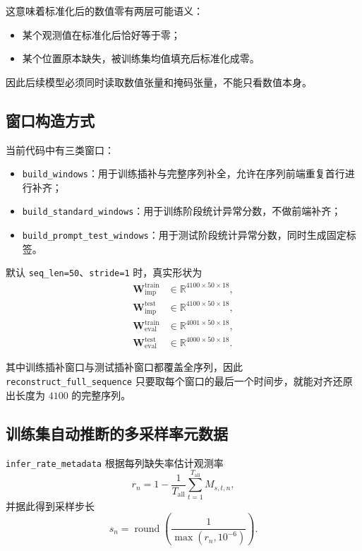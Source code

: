 \documentclass[UTF8]{ctexart}
\begin{document}
这意味着标准化后的数值零有两层可能语义：
\begin{itemize}
    \item 某个观测值在标准化后恰好等于零；
    \item 某个位置原本缺失，被训练集均值填充后标准化成零。
\end{itemize}

因此后续模型必须同时读取数值张量和掩码张量，不能只看数值本身。

\subsection{窗口构造方式}

当前代码中有三类窗口：
\begin{itemize}
    \item \texttt{build\_windows}：用于训练插补与完整序列补全，允许在序列前端重复首行进行补齐；
    \item \texttt{build\_standard\_windows}：用于训练阶段统计异常分数，不做前端补齐；
    \item \texttt{build\_prompt\_test\_windows}：用于测试阶段统计异常分数，同时生成固定标签。
\end{itemize}

默认 \texttt{seq\_len=50}、\texttt{stride=1} 时，真实形状为
\begin{align}
    \bm{W}^{\text{train}}_{\text{imp}} &\in \mathbb{R}^{4100 \times 50 \times 18}, \\
    \bm{W}^{\text{test}}_{\text{imp}} &\in \mathbb{R}^{4100 \times 50 \times 18}, \\
    \bm{W}^{\text{train}}_{\text{eval}} &\in \mathbb{R}^{4001 \times 50 \times 18}, \\
    \bm{W}^{\text{test}}_{\text{eval}} &\in \mathbb{R}^{4000 \times 50 \times 18}.
\end{align}

其中训练插补窗口与测试插补窗口都覆盖全序列，因此 \texttt{reconstruct\_full\_sequence} 只要取每个窗口的最后一个时间步，就能对齐还原出长度为 \(4100\) 的完整序列。

\subsection{训练集自动推断的多采样率元数据}

\texttt{infer\_rate\_metadata} 根据每列缺失率估计观测率
\begin{equation}
    r_n = 1 - \frac{1}{T_{\text{all}}}\sum_{t=1}^{T_{\text{all}}} M_{s,t,n},
\end{equation}
并据此得到采样步长
\begin{equation}
    s_n = \operatorname{round}\!\left(\frac{1}{\max(r_n,10^{-6})}\right).
\end{equation}
\end{document}
